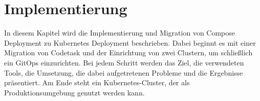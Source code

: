 \chapter{Implementierung}

In diesem Kapitel wird die Implementierung und Migration von Compose Deployment zu Kubernetes Deployment beschrieben.
Dabei beginnt es mit einer Migration von Codetask und der Einrichtung von zwei Clustern, um schließlich ein GitOps einzurichten.
Bei jedem Schritt werden das Ziel, die verwendeten Tools, die Umsetzung, die dabei aufgetretenen Probleme und die Ergebnisse präsentiert. 
Am Ende steht ein Kubernetes-Cluster, der als Produktionsumgebung genutzt werden kann.




